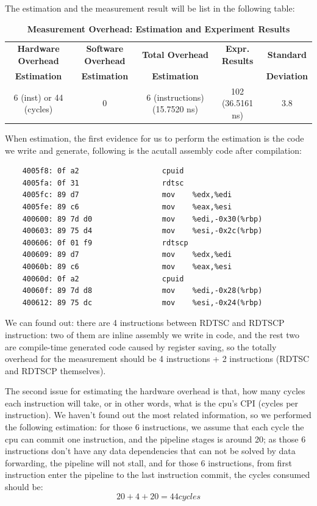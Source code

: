 The estimation and the measurement result will be list in the following table:

\begin{table}[ht]
  \centering
  \caption{\textbf{Measurement Overhead: Estimation and Experiment Results}}
  \hspace*{-2em}\begin{threeparttable}
  \begin{tabular}{ccccc}
  \hline
      \textbf{Hardware Overhead} & \textbf{Software Overhead } & \textbf{Total Overhead} & \textbf{Expr. Results} & \textbf{Standard} \\
      \textbf{Estimation}       &  \textbf{Estimation}         & \textbf{Estimation}  &   & \textbf{Deviation}  \\
  \hline
      6 (inst) or 44 (cycles) & 0 & 6 (instructions) (15.7520 ns) & 102 (36.5161 ns) & 3.8\\
  \hline
  \end{tabular}
  \end{threeparttable}
  \label{measurement_overhead_table}
\end{table}

When estimation, the first evidence for us to perform the estimation is the code we write and generate, following is the acutall assembly code after compilation:

\begin{lstlisting}
    4005f8:	0f a2                	cpuid
    4005fa:	0f 31                	rdtsc
    4005fc:	89 d7                	mov    %edx,%edi
    4005fe:	89 c6                	mov    %eax,%esi
    400600:	89 7d d0             	mov    %edi,-0x30(%rbp)
    400603:	89 75 d4             	mov    %esi,-0x2c(%rbp)
    400606:	0f 01 f9             	rdtscp
    400609:	89 d7                	mov    %edx,%edi
    40060b:	89 c6                	mov    %eax,%esi
    40060d:	0f a2                	cpuid
    40060f:	89 7d d8             	mov    %edi,-0x28(%rbp)
    400612:	89 75 dc             	mov    %esi,-0x24(%rbp)
\end{lstlisting}

We can found out: there are 4 instructions between RDTSC and RDTSCP instruction: two of them are inline assembly we write in code, and the rest two are compile-time generated code caused by
register saving, so the totally overhead for the measurement should be 4 instructions + 2 instructions (RDTSC and RDTSCP themselves).

The second issue for estimating the hardware overhead is that, how many cycles each instruction will take, or in other words, what is the cpu's CPI (cycles per instruction). We haven't found out
the most related information, so we performed the following estimation: for those 6 instructions, we assume that each cycle the cpu can commit one instruction, and the pipeline stages is around 20;
as those 6 instructions don't have any data dependencies that can not be solved by data forwarding, the pipeline will not stall, and for those 6 instructions, from first instruction enter the pipeline
to the last instruction commit, the cycles consumed should be:
    $$ 20 + 4 + 20 = 44 cycles $$

